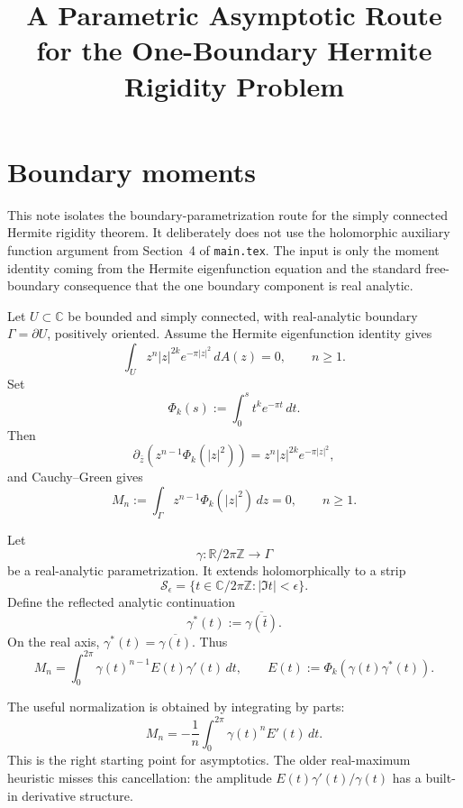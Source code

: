\documentclass[11pt]{article}
\title{A Parametric Asymptotic Route for the One-Boundary Hermite Rigidity Problem}
\author{}
\date{}
\newcommand{\C}{\mathbb C}
\newcommand{\R}{\mathbb R}
\newcommand{\Z}{\mathbb Z}
\newcommand{\dd}{\,d}
\newcommand{\pbar}{\partial_{\bar z}}
\begin{document}
\maketitle

\section{Boundary moments}

This note isolates the boundary-parametrization route for the simply connected
Hermite rigidity theorem.  It deliberately does not use the holomorphic auxiliary
function argument from Section~4 of \texttt{main.tex}.  The input is only the
moment identity coming from the Hermite eigenfunction equation and the standard
free-boundary consequence that the one boundary component is real analytic.

Let \(U\subset\C\) be bounded and simply connected, with real-analytic boundary
\(\Gamma=\partial U\), positively oriented.  Assume the Hermite eigenfunction
identity gives
\begin{equation}\label{eq:bulk-moments}
  \int_U z^n |z|^{2k}e^{-\pi |z|^2}\dd A(z)=0,
  \qquad n\ge1 .
\end{equation}
Set
\begin{equation}\label{eq:Phi-def}
  \Phi_k(s):=\int_0^s t^k e^{-\pi t}\dd t .
\end{equation}
Then
\[
  \pbar\!\left(z^{n-1}\Phi_k(|z|^2)\right)
  =
  z^n|z|^{2k}e^{-\pi|z|^2},
\]
and Cauchy--Green gives
\begin{equation}\label{eq:boundary-moments}
  M_n:=\int_{\Gamma}z^{n-1}\Phi_k(|z|^2)\dd z=0,
  \qquad n\ge1 .
\end{equation}

Let
\[
  \gamma:\R/2\pi\Z\to\Gamma
\]
be a real-analytic parametrization.  It extends holomorphically to a strip
\[
  \mathcal S_\epsilon=\{t\in\C/2\pi\Z:|\Im t|<\epsilon\}.
\]
Define the reflected analytic continuation
\[
  \gamma^*(t):=\overline{\gamma(\bar t)}.
\]
On the real axis, \(\gamma^*(t)=\overline{\gamma(t)}\).  Thus
\begin{equation}\label{eq:param-moment}
  M_n=\int_0^{2\pi}
  \gamma(t)^{n-1}
  E(t)\gamma'(t)\dd t,
  \qquad
  E(t):=\Phi_k(\gamma(t)\gamma^*(t)).
\end{equation}

The useful normalization is obtained by integrating by parts:
\begin{equation}\label{eq:ibp}
  M_n
  =
  -\frac1n\int_0^{2\pi}\gamma(t)^n E'(t)\dd t .
\end{equation}
This is the right starting point for asymptotics.  The older real-maximum
heuristic misses this cancellation: the amplitude
\(E(t)\gamma'(t)/\gamma(t)\) has a built-in derivative structure.
\end{document}
